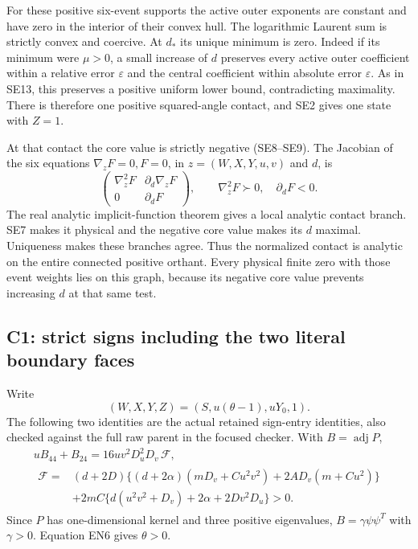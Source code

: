 For these positive six-event supports the active outer exponents are
constant and have zero in the interior of their convex hull.  The
logarithmic Laurent sum is strictly convex and coercive.  At \(d_*\)
its unique minimum is zero.  Indeed if its minimum were \(\mu>0\),
a small increase of \(d\) preserves every active outer coefficient
within a relative error \(\varepsilon\) and the central coefficient
within absolute error \(\varepsilon\).  As in SE13, this preserves a
positive uniform lower bound, contradicting maximality.
There is therefore one positive squared-angle contact, and SE2 gives
one state with \(Z=1\).

At that contact the core value is strictly negative (SE8--SE9).
The Jacobian of the six equations
\(\nabla_zF=0,F=0\), in \(z=(W,X,Y,u,v)\) and \(d\), is
\[
 \begin{pmatrix}\nabla_z^2F&\partial_d\nabla_zF\\
 0&\partial_dF\end{pmatrix},
 \qquad \nabla_z^2F\succ0,\quad\partial_dF<0 .
 \tag{EN4}
\]
The real analytic implicit-function theorem gives a local analytic
contact branch.  SE7 makes it physical and the negative core value
makes its \(d\) maximal.  Uniqueness makes these branches agree.
Thus the normalized contact is analytic on the entire connected
positive orthant.  Every physical finite zero with those event weights
lies on this graph, because its negative core value prevents increasing
\(d\) at that same test.

\subsection{C1: strict signs including the two literal boundary faces}

Write
\[
 (W,X,Y,Z)=(S,u(\theta-1),uY_0,1).
 \tag{EN5}
\]
The following two identities are the actual retained sign-entry
identities, also checked against the full raw parent in the focused
checker.  With \(B=\operatorname{adj}P\),
\[
\begin{gathered}
 uB_{44}+B_{24}
 =16uv^2D_u^2D_v\,\mathcal F,\\
\begin{aligned}
 \mathcal F={}&(d+2D)\{(d+2\alpha)(mD_v+Cu^2v^2)
                       +2AD_v(m+Cu^2)\}\\
 &+2mC\{d(u^2v^2+D_v)+2\alpha+2Dv^2D_u\}>0 .
\end{aligned}
\end{gathered}\tag{EN6}
\]
Since \(P\) has one-dimensional kernel and three positive eigenvalues,
\(B=\gamma\psi\psi^T\) with \(\gamma>0\).  Equation EN6 gives
\(\theta>0\).


